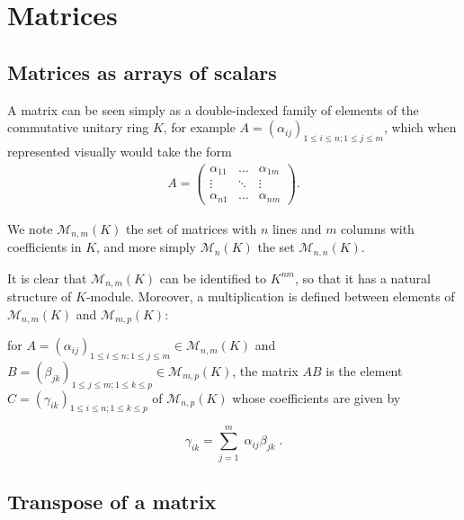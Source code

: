 \documentclass{report}
\theoremstyle{definition}
\theoremstyle{remark}
\begin{document}
\section{Matrices}

\subsection{Matrices as arrays of scalars}
A matrix can be seen simply as a double-indexed family of elements of the commutative unitary ring $K$, for example $A = (\alpha_{ij})_{1 \leq i \leq n ;1 \leq j \leq m}$, which when represented visually would take the form 
\begin{equation*}
    \begin{split}
        A = 
        \begin{pmatrix}
            \alpha_{11} & \dots & \alpha_{1m} \\
            \vdots & \ddots & \vdots \\
            \alpha_{n1} & \dots & \alpha_{nm}
         \end{pmatrix}.
    \end{split}
\end{equation*}
 
 We note $\mathcal{M}_{n , m}(K)$ the set of matrices with $n$ lines and $m$ columns with coefficients in $K$, and more simply $\mathcal{M}_{n}(K)$ the set $\mathcal{M}_{n , n}(K)$.
 
 \medskip
 It is clear that $\mathcal{M}_{n , m}(K)$ can be identified to $K^{nm}$, so that it has a natural structure of $K$-module. Moreover, a multiplication is defined between elements of $\mathcal{M}_{n , m}(K)$ and $\mathcal{M}_{m , p}(K)$: 
 
 for $A= (\alpha_{ij})_{1 \leq i \leq n ;1 \leq j \leq m}\in\mathcal{M}_{n , m}(K) $ and $B= (\beta_{jk})_{1 \leq j \leq m ;1 \leq k \leq p}\in\mathcal{M}_{m , p}(K) $, the matrix $AB$ is the element $C= (\gamma_{ik})_{1 \leq i \leq n ;1 \leq k \leq p}$ of $\mathcal{M}_{n , p}(K)$ whose coefficients are given by
 
 $$\gamma_{ik}=\sum_{j=1}^m \; \alpha_{ij}\beta_{jk}\;.$$
 
 \bigskip
 \subsection{Transpose of a matrix}
\end{document}
